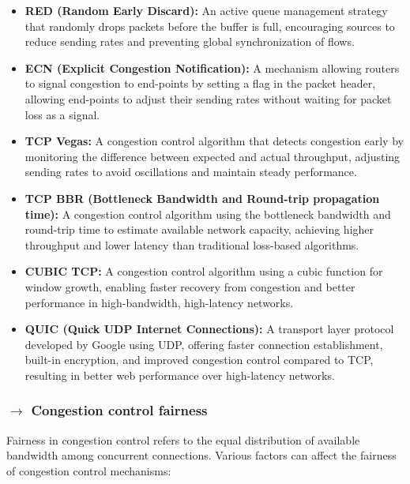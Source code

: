 \begin{itemize}
    \item \textbf{RED (Random Early Discard):} An active queue management strategy that randomly drops packets before the buffer is full, encouraging sources to reduce sending rates and preventing global synchronization of flows.
    
    \item \textbf{ECN (Explicit Congestion Notification):} A mechanism allowing routers to signal congestion to end-points by setting a flag in the packet header, allowing end-points to adjust their sending rates without waiting for packet loss as a signal.
    
    \item \textbf{TCP Vegas:} A congestion control algorithm that detects congestion early by monitoring the difference between expected and actual throughput, adjusting sending rates to avoid oscillations and maintain steady performance.
    
    \item \textbf{TCP BBR (Bottleneck Bandwidth and Round-trip propagation time):} A congestion control algorithm using the bottleneck bandwidth and round-trip time to estimate available network capacity, achieving higher throughput and lower latency than traditional loss-based algorithms.
    
    \item \textbf{CUBIC TCP:} A congestion control algorithm using a cubic function for window growth, enabling faster recovery from congestion and better performance in high-bandwidth, high-latency networks.
    
    \item \textbf{QUIC (Quick UDP Internet Connections):} A transport layer protocol developed by Google using UDP, offering faster connection establishment, built-in encryption, and improved congestion control compared to TCP, resulting in better web performance over high-latency networks.
\end{itemize}

\subsubsection[3.6.5 Congestion control fairness]{$\rightarrow$ Congestion control fairness}

Fairness in congestion control refers to the equal distribution of available bandwidth among concurrent connections. Various factors can affect the fairness of congestion control mechanisms:

